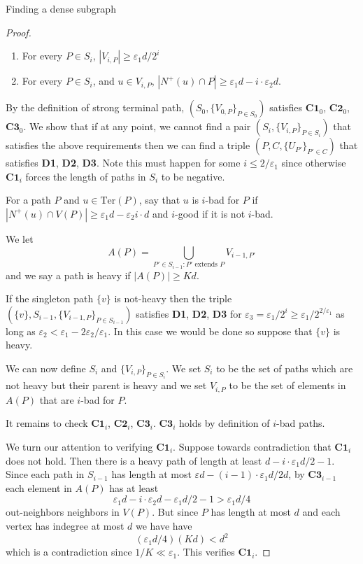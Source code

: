 \documentclass[11pt,a4paper]{article}
\newcommand{\vep}{\varepsilon}
\newcommand{\Ter}{\mathrm{Ter}}
\begin{document}
\begin{section}{Finding a dense subgraph}
\begin{proof}
\begin{enumerate}
\item[$\textbf{C2}_i$] For every $P \in S_i$, $| V_{i, P} | \geq \vep_1 d/2^i$
\item[$\textbf{C3}_i$] For every $P \in S_i$, and $u \in V_{i, P}$, $|N^+(u) \cap P| \geq \vep_1 d - i \cdot \vep_2 d$.
\end{enumerate}
By the definition of strong terminal path, $(S_0, \{V_{0, P} \}_{P \in S_0})$ satisfies $\textbf{C1}_0$, $\textbf{C2}_0$, $\textbf{C3}_0$.
We show that if at any point, we cannot find a pair $(S_i, \{V_{i, P}\}_{P \in S_i})$ that satisfies the above requirements then we can find a triple $(P, C, \{U_{P'} \}_{P' \in C})$ that satisfies \textbf{D1}, \textbf{D2}, \textbf{D3}. Note this must happen for some $i \leq 2/\vep_1$ since otherwise $\textbf{C1}_i$ forces the length of paths in $S_i$ to be negative.

\medskip

For a path $P$ and $u \in \Ter(P)$, say that $u$ is $i$-bad for $P$ if $| N^+(u) \cap V(P)| \geq \vep_1 d - \vep_2 i \cdot d$ and $i$-good if it is not $i$-bad.

\medskip

We let
\[
A(P) = \bigcup_{P' \in S_{i - 1}: P' \text{ extends } P } V_{i - 1, P'}
\]
and we say a path is heavy if $|A(P)| \geq K d$.

\medskip

If the singleton path $\{v\}$ is not-heavy then the triple $(\{v\}, S_{i - 1}, \{V_{i - 1, P} \}_{P \in S_{i - 1}} )$ satisfies \textbf{D1}, \textbf{D2}, \textbf{D3} for $\vep_3 = \vep_1 /2^i \geq \vep_1 / 2^{2/\vep_1}$ as long as $\vep_2 < \vep_1 - 2 \vep_2/\vep_1 $. In this case we would be done so suppose that $\{v \}$ is heavy.

\medskip

We can now define $S_i$ and $\{V_{i, P} \}_{P \in S_i}$. We set $S_i$ to be the set of paths which are not heavy but their parent is heavy and we set $V_{i, P}$ to be the set of elements in $ A(P) $ that are $i$-bad for $P$.

\medskip

It remains to check $\textbf{C1}_i$, $\textbf{C2}_i$, $\textbf{C3}_i$. $\textbf{C3}_i$ holds by definition of $i$-bad paths.

\bigskip

We turn our attention to verifying $\textbf{C1}_i$. Suppose towards contradiction that $\textbf{C1}_i$ does not hold. Then there is a heavy path of length at least $d - i \cdot \vep_1 d /2 - 1$. Since each path in $S_{i - 1}$ has length at most $\vep d - (i - 1) \cdot \vep_1 d /2 d$, by $\textbf{C3}_{i - 1}$ each element in $A(P)$ has at least
\[
\vep_1 d - i \cdot \vep_2 d - \vep_1 d/2 - 1 > \vep_1 d/ 4
\]
out-neighbors neighbors in $V(P)$. But since $P$ has length at most $d$ and each vertex has indegree at most $d$ we have have
\[
(\vep_1 d/4) (K d) < d^2
\]
which is a contradiction since $1/K \ll \vep_1$. This verifies $\textbf{C1}_i$.


\end{proof}
\end{section}
\end{document}
